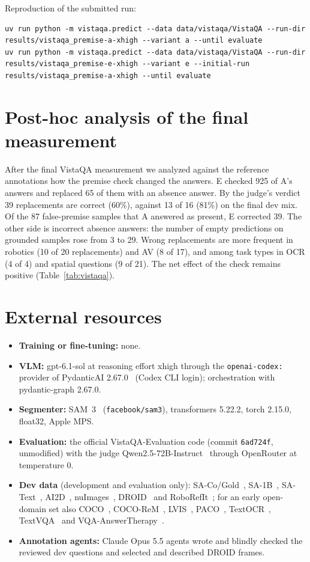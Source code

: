\documentclass{article}
\begin{document}
Reproduction of the submitted run:
\begin{lstlisting}
uv run python -m vistaqa.predict --data data/vistaqa/VistaQA --run-dir results/vistaqa_premise-a-xhigh --variant a --until evaluate
uv run python -m vistaqa.predict --data data/vistaqa/VistaQA --run-dir results/vistaqa_premise-e-xhigh --variant e --initial-run results/vistaqa_premise-a-xhigh --until evaluate
\end{lstlisting}

\section{Post-hoc analysis of the final measurement}
\label{app:posthoc}

After the final VistaQA measurement we analyzed against the reference annotations how the premise check changed the answers.
E checked 925 of A's answers and replaced 65 of them with an absence answer.
By the judge's verdict 39 replacements are correct (60\%), against 13 of 16 (81\%) on the final dev mix.
Of the 87 false-premise samples that A answered as present, E corrected 39.
The other side is incorrect absence answers: the number of empty predictions on grounded samples rose from 3 to 29.
Wrong replacements are more frequent in robotics (10 of 20 replacements) and AV (8 of 17),
and among task types in OCR (4 of 4) and spatial questions (9 of 21).
The net effect of the check remains positive (Table~\ref{tab:vistaqa}).

\section{External resources}
\label{app:resources}

\begin{itemize}
  \item \textbf{Training or fine-tuning:} none.
  \item \textbf{VLM:} gpt-6.1-sol at reasoning effort xhigh through the \texttt{openai-codex:} provider of PydanticAI 2.67.0~\citep{pydanticai} (Codex CLI login);
    orchestration with pydantic-graph 2.67.0.
  \item \textbf{Segmenter:} SAM~3~\citep{sam3} (\texttt{facebook/sam3}), transformers 5.22.2, torch 2.15.0, float32, Apple MPS.
  \item \textbf{Evaluation:} the official VistaQA-Evaluation code (commit \texttt{6ad724f}, unmodified)
    with the judge Qwen2.5-72B-Instruct~\citep{qwen25} through OpenRouter at temperature 0.
  \item \textbf{Dev data} (development and evaluation only):
    SA-Co/Gold~\citep{sam3}, SA-1B~\citep{sam}, SA-Text~\citep{satext}, AI2D~\citep{ai2d}, nuImages~\citep{nuscenes},
    DROID~\citep{droid} and RoboRefIt~\citep{roborefit};
    for an early open-domain set also COCO~\citep{coco}, COCO-ReM~\citep{cocorem}, LVIS~\citep{lvis}, PACO~\citep{paco},
    TextOCR~\citep{textocr}, TextVQA~\citep{textvqa} and VQA-AnswerTherapy~\citep{vqatherapy}.
  \item \textbf{Annotation agents:} Claude Opus 5.5 agents wrote and blindly checked the reviewed dev questions
    and selected and described DROID frames.
\end{itemize}
\end{document}
